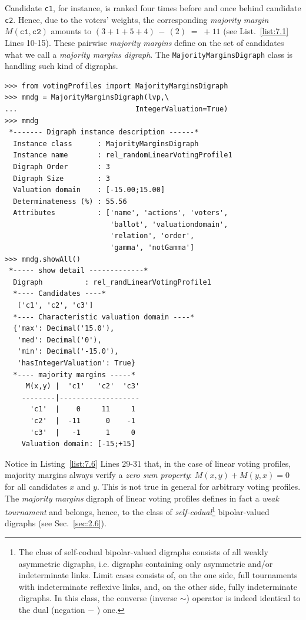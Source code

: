 Candidate \texttt{c1}, for instance, is ranked four times before and once behind candidate \texttt{c2}. Hence, due to the voters' weights, the corresponding \emph{majority margin} $M(\mathtt{c1},\mathtt{c2})$ amounts to  $(3+1+5+4)\, -\,(2)\; =\; +11$ (see List.~\vref{list:7.1} Lines 10-15). These pairwise \emph{majority margins} define on the set of candidates what we call a \emph{majority margins digraph}. The \texttt{MajorityMarginsDigraph} class is handling such kind of digraphs.
\begin{lstlisting}[caption={Example of \emph{Majority Margins} digraph},label=list:7.6]
>>> from votingProfiles import MajorityMarginsDigraph
>>> mmdg = MajorityMarginsDigraph(lvp,\
...                            IntegerValuation=True)
>>> mmdg
 *------- Digraph instance description ------*
  Instance class      : MajorityMarginsDigraph
  Instance name       : rel_randomLinearVotingProfile1
  Digraph Order       : 3
  Digraph Size        : 3
  Valuation domain    : [-15.00;15.00]
  Determinateness (%) : 55.56
  Attributes          : ['name', 'actions', 'voters',
                         'ballot', 'valuationdomain',
                         'relation', 'order',
                         'gamma', 'notGamma']
>>> mmdg.showAll()
 *----- show detail -------------*
  Digraph          : rel_randLinearVotingProfile1
  *---- Candidates ----*
   ['c1', 'c2', 'c3']
  *---- Characteristic valuation domain ----*
  {'max': Decimal('15.0'),
   'med': Decimal('0'),
   'min': Decimal('-15.0'),
   'hasIntegerValuation': True}
  *---- majority margins -----*
     M(x,y) |  'c1'   'c2'  'c3'	  
    --------|-------------------
      'c1'  |    0     11     1	 
      'c2'  |  -11      0    -1	 
      'c3'  |   -1      1     0	 
    Valuation domain: [-15;+15]
\end{lstlisting}

Notice in Listing~\ref{list:7.6} Lines 29-31 that, in the case of linear voting profiles, majority margins always verify a \emph{zero sum property}: $M(x,y) + M(y,x) = 0$ for all candidates $x$ and $y$. This is not true in general for arbitrary voting profiles. The \emph{majority margins} digraph of linear voting profiles defines in fact a \emph{weak tournament} and belongs, hence, to the class of \emph{self-codual}\footnote{The class of self-codual bipolar-valued digraphs consists of all weakly asymmetric digraphs, i.e. digraphs containing only asymmetric and/or indeterminate links. Limit cases consists of, on the one side, full tournaments with indeterminate reflexive links, and, on the other side, fully indeterminate digraphs. In this class, the converse (inverse $\sim$) operator is indeed identical to the dual (negation $-$ ) one.} bipolar-valued digraphs (see Sec.~\ref{sec:2.6}).
    
